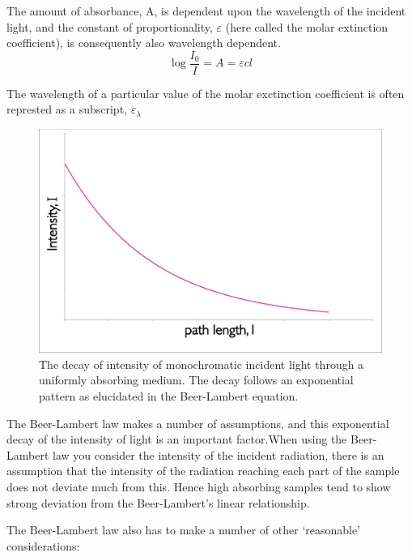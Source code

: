 \documentclass[
]{book}
\begin{document}
The amount of absorbance, A, is dependent upon the wavelength of the incident light, and the constant of proportionality, \(\varepsilon\) (here called the molar extinction coefficient), is consequently also wavelength dependent.
\begin{equation}
\log \frac{I_0}{I}=A=\varepsilon cl
\label{eq:BeerLambert}
\end{equation}

The wavelength of a particular value of the molar exctinction coefficient is often represted as a subscript, \(\varepsilon _\lambda\)

\begin{figure}

{\centering \includegraphics[width=0.5\linewidth]{images/BeerLambert} 

}

\caption{The decay of intensity of monochromatic incident light through a uniformly absorbing medium. The decay follows an exponential pattern as elucidated in the Beer-Lambert equation.}\label{fig:BeerLambert}
\end{figure}

The Beer-Lambert law makes a number of assumptions, and this exponential decay of the intensity of light is an important factor.When using the Beer-Lambert law you consider the intensity of the incident radiation, there is an assumption that the intensity of the radiation reaching each part of the sample does not deviate much from this. Hence high absorbing samples tend to show strong deviation from the Beer-Lambert's linear relationship.

The Beer-Lambert law also has to make a number of other `reasonable' considerations:
\end{document}
